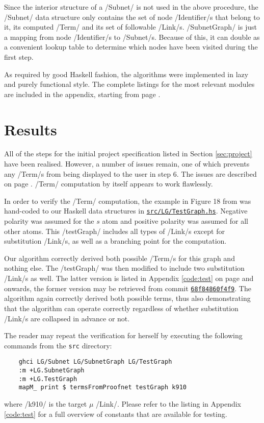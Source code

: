 \documentclass[12pt,a4paper]{article}
\newcommand{\coderef}[1]{\href{https://github.com/jgonggrijp/net-prove/blob/report/#1}{\texttt{#1}}}
\begin{document}
Since the interior structure of a \hs/Subnet/ is not used in the above procedure, the \hs/Subnet/ data structure only contains the set of node \hs/Identifier/s that belong to it, its computed \hs/Term/ and its set of followable \hs/Link/s. \hs/SubnetGraph/ is just a mapping from node \hs/Identifier/s to \hs/Subnet/s. Because of this, it can double as a convenient lookup table to determine which nodes have been visited during the first step.

As required by good Haskell fashion, the algorithms were implemented in lazy and purely functional style. The complete listings for the most relevant modules are included in the appendix, starting from page \pageref{code}.


\section{Results}

All of the steps for the initial project specification listed in Section \ref{sec:project} have been realised. However, a number of issues remain, one of which prevents any \hs/Term/s from being displayed to the user in step 6. The issues are described on page \pageref{sub:issues}. \hs/Term/ computation by itself appears to work flawlessly.

In order to verify the \hs/Term/ computation, the example in Figure 18 from \cite[p.~28]{mm12} was hand-coded to our Haskell data structures in \coderef{src/LG/TestGraph.hs}. Negative polarity was assumed for the $s$ atom and positive polarity was assumed for all other atoms. This \hs/testGraph/ includes all types of \hs/Link/s except for substitution \hs/Link/s, as well as a branching point for the computation.

Our algorithm correctly derived both possible \hs/Term/s for this graph and nothing else. The \hs/testGraph/ was then modified to include two substitution \hs/Link/s as well. The latter version is listed in Appendix \ref{code:test} on page \pageref{code:test} and onwards, the former version may be retrieved from commit \href{https://github.com/jgonggrijp/net-prove/blob/68f84860f4f9535e15a12161f5120fb25f6b4219/src/LG/TestGraph.hs}{\texttt{68f84860f4f9}}. The algorithm again correctly derived both possible terms, thus also demonstrating that the algorithm can operate correctly regardless of whether substitution \hs/Link/s are collapsed in advance or not.

The reader may repeat the verification for herself by executing the following commands from the \texttt{src} directory:
\begin{verbatim}
    ghci LG/Subnet LG/SubnetGraph LG/TestGraph
    :m +LG.SubnetGraph 
    :m +LG.TestGraph
    mapM_ print $ termsFromProofnet testGraph k910
\end{verbatim}
where \hs/k910/ is the target $\mu$ \hs/Link/. Please refer to the listing in Appendix \ref{code:test} for a full overview of constants that are available for testing.
\end{document}
